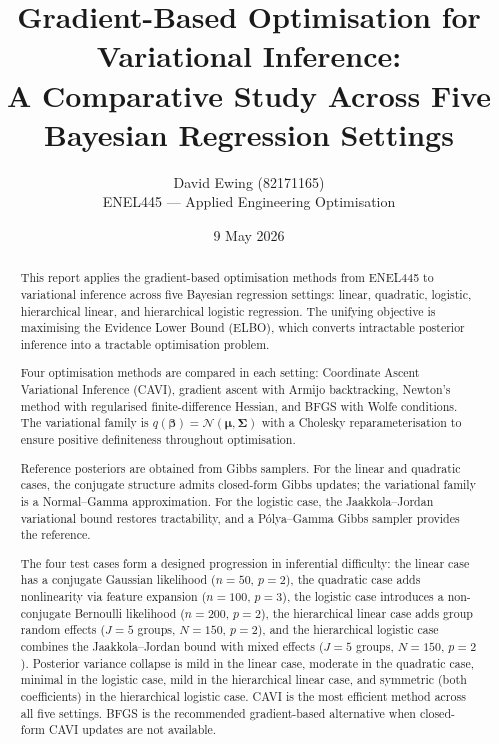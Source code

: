 \documentclass[11pt,a4paper]{article}
\title{
Gradient-Based Optimisation for Variational Inference:\\
A Comparative Study Across Five Bayesian Regression Settings
}
\author{
  David Ewing (82171165)\\
  ENEL445 --- Applied Engineering Optimisation
}
\date{9 May 2026}
\newcommand{\N}{\mathcal{N}}
\begin{document}
\maketitle

\begin{abstract}
\setlength{\parindent}{0pt}
\setlength{\parskip}{0.7em}

This report applies the gradient-based optimisation methods from ENEL445 to variational
inference across five Bayesian regression settings: linear, quadratic, logistic,
hierarchical linear, and hierarchical logistic regression.
The unifying objective is maximising the Evidence Lower Bound (ELBO), which converts
intractable posterior inference into a tractable optimisation problem.

Four optimisation methods are compared in each setting: Coordinate Ascent Variational
Inference (CAVI), gradient ascent with Armijo backtracking, Newton's method with
regularised finite-difference Hessian, and BFGS with Wolfe conditions.
The variational family is $q(\bm{\beta}) = \N(\bm{\mu}, \bm{\Sigma})$ with a Cholesky
reparameterisation to ensure positive definiteness throughout optimisation.

Reference posteriors are obtained from Gibbs samplers.
For the linear and quadratic cases, the conjugate structure admits closed-form Gibbs
updates; the variational family is a Normal--Gamma approximation.
For the logistic case, the Jaakkola--Jordan \parencite{Jaakkola2000} variational bound
restores tractability, and a P\'{o}lya--Gamma Gibbs sampler \parencite{Polson2013}
provides the reference.

The four test cases form a designed progression in inferential difficulty:
the linear case has a conjugate Gaussian likelihood ($n=50$, $p=2$),
the quadratic case adds nonlinearity via feature expansion ($n=100$, $p=3$),
the logistic case introduces a non-conjugate Bernoulli likelihood ($n=200$, $p=2$),
the hierarchical linear case adds group random effects ($J=5$ groups, $N=150$, $p=2$),
and the hierarchical logistic case combines the Jaakkola--Jordan bound with mixed effects
($J=5$ groups, $N=150$, $p=2$).
Posterior variance collapse is mild in the linear case, moderate in the quadratic case,
minimal in the logistic case, mild in the hierarchical linear case, and symmetric
(both coefficients) in the hierarchical logistic case.
CAVI is the most efficient method across all five settings.
BFGS is the recommended gradient-based alternative when closed-form CAVI updates are
not available.
\end{abstract}
\end{document}
